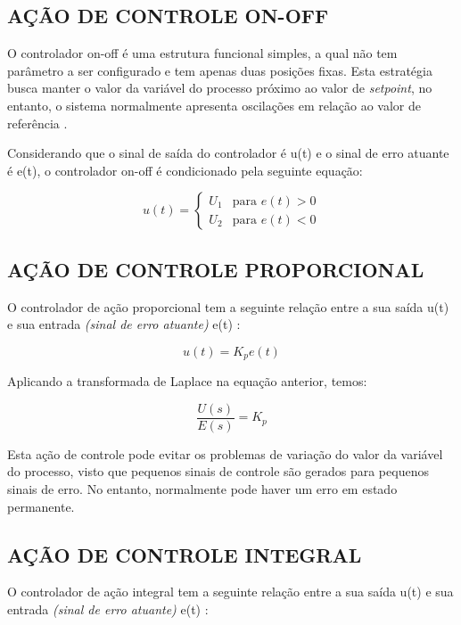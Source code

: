 \documentclass[12pt,oneside,a4paper, chapter=TITLE, section = TITLE, english, brazil]{abntex2}
\begin{document}
\subsection{AÇÃO DE CONTROLE ON-OFF}

O controlador on-off é uma estrutura funcional simples, a qual não tem parâmetro a ser configurado e tem apenas duas posições fixas. Esta estratégia busca manter o valor da variável do processo  próximo ao valor de \textit{setpoint}, no entanto, o sistema normalmente apresenta oscilações em relação ao valor de referência \cite{astrom}.

Considerando que o sinal de saída do controlador é u(t) e o sinal de erro atuante é e(t), o controlador on-off é condicionado pela seguinte equação:

\begin{displaymath}
u(t) = \left\{ \begin{array}{ll}
U_{1} & \textrm{para $e(t)>0$}\\
U_{2} & \textrm{para $e(t)<0$}
\end{array} \right.
\end{displaymath}

\subsection{AÇÃO DE CONTROLE PROPORCIONAL}

O controlador de ação proporcional tem a seguinte relação entre a sua saída u(t) e sua entrada \textit{(sinal de erro atuante)} e(t) \cite{ogata}:

$$u(t) = K_{p} e(t)$$

Aplicando a transformada de Laplace na equação anterior, temos:

\begin{equation}
\frac{U(s)}{E(s)} = K_{p} \label{eq:g_s_cont_prop}
\end{equation}

Esta ação de controle pode evitar os problemas de variação do valor da variável do processo, visto que pequenos sinais de controle são gerados para pequenos sinais de erro. No entanto, normalmente pode haver um erro em estado permanente.

\subsection{AÇÃO DE CONTROLE INTEGRAL}

O controlador de ação integral tem a seguinte relação entre a sua saída u(t) e sua entrada \textit{(sinal de erro atuante)} e(t) \cite{ogata}:
\end{document}
